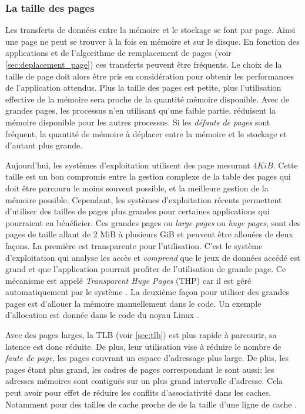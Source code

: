 \subsubsection{La taille des pages}
Les transferts de données entre la mémoire et le stockage se font par page. Ainsi une page ne peut se trouver à la fois en mémoire et sur le disque. En fonction des applications et de l'algorithme de remplacement de pages (voir \autoref{sec:deplacement_page}) ces transferts peuvent être fréquents. Le choix de la taille de page doit alors être pris en considération pour obtenir les performances de l'application attendus.
Plus la taille des pages est petite, plus l'utilisation effective de la mémoire sera proche de la quantité mémoire disponible. Avec de grandes pages, les processus n'en utilisant qu'une faible partie, réduisent la mémoire disponible pour les autres processus. Si les \textit{défauts de pages} sont fréquent, la quantité de mémoire à déplacer entre la mémoire et le stockage et d'autant plus grande.

Aujourd'hui, les systèmes d'exploitation utilisent des page mesurant $4 KiB$. Cette taille est un bon compromis entre la gestion complexe de la table des pages qui doit être parcouru le moins souvent possible, et la meilleure gestion de la mémoire possible. 
Cependant, les systèmes d'exploitation récents permettent d'utiliser des tailles de pages plus grandes pour certaines applications qui pourraient en bénéficier. Ces grandes pages ou \textit{large pages} ou \textit{huge pages}, sont des pages de taille allant de 2 MiB à plusieurs GiB et peuvent être allouées de deux façons. La première est transparente pour l'utilisation. C'est le système d'exploitation qui analyse les accès et \textit{comprend} que le jeux de données accédé est grand et que l'application pourrait profiter de l'utilisation de grande page. Ce mécanisme est appelé \textit{Transparent Huge Pages} (THP) car il est géré automatiquement par le système \cite{LinuxTHP2019}. La deuxième façon pour utiliser des grandes pages est d'allouer la mémoire manuellement dans le code. Un exemple d'allocation est donnée dans le code du noyau Linux \cite{LinuxHUGE2019}.

Avec des pages larges, la TLB (voir \autoref{sec:tlb}) est plus rapide à parcourir, sa latence est donc réduite. De plus, leur utilisation vise à réduire le nombre de \textit{faute de page}, les pages couvrant un espace d'adressage plus large. De plus, les pages étant plus grand, les cadres de pages correspondant le sont aussi: les adresses mémoires sont contiguës sur un plus grand intervalle d'adresse. Cela peut avoir pour effet de réduire les conflits d'associativité dans les caches. Notamment pour des tailles de cache proche de de la taille d'une ligne de cache \cite{LinuxHUGETEST2019}.






